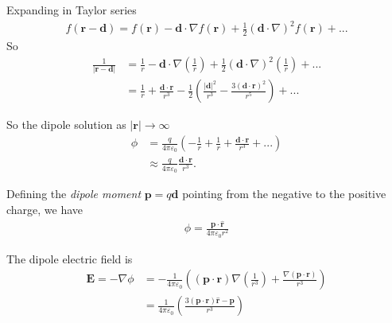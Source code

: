 \documentclass[a4paper]{article}
\begin{document}
Expanding in Taylor series
\begin{equation*}
\begin{aligned}
f(\mathbf{r}-\mathbf{d}) = f(\mathbf{r}) - \mathbf{d} \cdot \nabla f(\mathbf{r}) + \frac{1}{2}(\mathbf{d} \cdot \nabla)^2 f(\mathbf{r}) + ...
\end{aligned}
\end{equation*}
So
\begin{equation*}
\begin{aligned}
\frac{1}{|\mathbf{r} - \mathbf{d}|} &= \frac{1}{r} - \mathbf{d} \cdot \nabla\left(\frac{1}{r}\right) + \frac{1}{2}(\mathbf{d}\cdot \nabla)^2 \left(\frac{1}{r}\right)+...\\
&= \frac{1}{r} + \frac{\mathbf{d} \cdot \mathbf{r}}{r^3} - \frac{1}{2}\left(\frac{|\mathbf{d}|^2}{r^3} - \frac{3(\mathbf{d} \cdot \mathbf{r})^2}{r^5}\right)+...
\end{aligned}
\end{equation*}

So the dipole solution as $|\mathbf{r}| \to \infty$
\begin{equation*}
\begin{aligned}
\phi &= \frac{q}{4\pi \varepsilon_0} \left(-\frac{1}{r} + \frac{1}{r} + \frac{\mathbf{d} \cdot \mathbf{r}}{r^3} + ... \right)\\
&\approx \frac{q}{4\pi \varepsilon_0} \frac{\mathbf{d} \cdot \mathbf{r}}{r^3}.
\end{aligned}
\end{equation*}

Defining the \emph{dipole moment} $\mathbf{p} = q\mathbf{d}$ pointing from the negative to the positive charge, we have
\begin{equation*}\tag{2.17} \label{eq:2.17}
\begin{aligned}
\phi = \frac{\mathbf{p} \cdot \hat{\mathbf{r}}}{4\pi \varepsilon_0 r^2}
\end{aligned}
\end{equation*}

The dipole electric field is
\begin{equation*}\tag{2.18} \label{eq:2.18}
\begin{aligned}
\mathbf{E} = -\nabla \phi &= -\frac{1}{4\pi \varepsilon_0} \left((\mathbf{p} \cdot \mathbf{r}) \nabla \left(\frac{1}{r^3}\right) + \frac{\nabla(\mathbf{p} \cdot \mathbf{r})}{r^3}\right)\\
&=\frac{1}{4\pi \varepsilon_0} \left(\frac{3(\mathbf{p} \cdot \mathbf{r}) \hat{\mathbf{r}} - \mathbf{p}}{r^3}\right)
\end{aligned}
\end{equation*}
\end{document}
